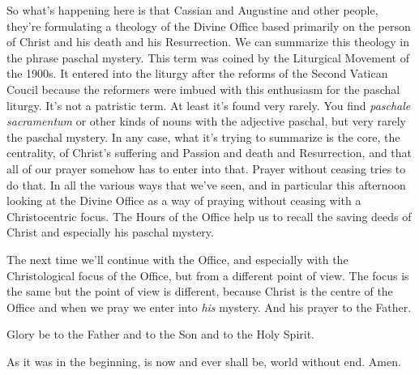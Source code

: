 So what's happening here is that Cassian and Augustine and other people, they're formulating a theology of the Divine Office based primarily on the person of Christ and his death and his Resurrection. We can summarize this theology in the phrase paschal mystery. This term was coined by the Liturgical Movement of the 1900s. It entered into the liturgy after the reforms of the Second Vatican Coucil because the reformers were imbued with this enthusiasm for the paschal liturgy. It's not a patristic term. At least it's found very rarely. You find \emph{paschale sacramentum} or other kinds of nouns with the adjective paschal, but very rarely the paschal mystery. In any case, what it's trying to summarize is the core, the centrality, of Christ's suffering and Passion and death and Resurrection, and that all of our prayer somehow has to enter into that. Prayer without ceasing tries to do that. In all the various ways that we've seen, and in particular this afternoon looking at the Divine Office as a way of praying without ceasing with a Christocentric focus. The Hours of the Office help us to recall the saving deeds of Christ and especially his paschal mystery.

The next time we'll continue with the Office, and especially with the Christological focus of the Office, but from a different point of view. The focus is the same but the point of view is different, because Christ is the centre of the Office and when we pray we enter into \emph{his} mystery. And his prayer to the Father.

\smallskip

\begin{itshape}
\noindent Glory be to the Father and to the Son and to the Holy Spirit.

\noindent As it was in the beginning, is now and ever shall be, world without end. Amen.
\end{itshape}
